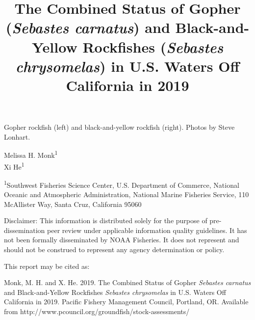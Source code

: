 \documentclass[12pt,]{article}
\title{The Combined Status of Gopher (\emph{Sebastes carnatus}) and
Black-and-Yellow Rockfishes (\emph{Sebastes chrysomelas}) in U.S. Waters
Off California in 2019}
\author{}
\date{}
\begin{document}
\maketitle


\begin{center}
\thispagestyle{empty}


\vspace{.5cm}

Gopher rockfish (left) and black-and-yellow rockfish (right).      
\small
Photos by Steve Lonhart.

\vspace{.3cm}


Melissa H. Monk\textsuperscript{1}\\
Xi He\textsuperscript{1}\\

\vspace{.5cm}

\small
\textsuperscript{1}Southwest Fisheries Science Center, U.S. Department of Commerce, National Oceanic and Atmospheric Administration, National Marine Fisheries Service, 110 McAllister Way, Santa Cruz, California 95060\\

\vspace{1.5cm}


Disclaimer: This information is distributed solely for the purpose of pre-dissemination
peer review under applicable information quality guidelines. It has not been formally
disseminated by NOAA Fisheries. It does not represent and should not be construed to
represent any agency determination or policy. 

\vspace{.1cm}


\newpage{\thispagestyle{empty}}


\begin{flushleft}
This report may be cited as:

Monk, M. H.  and X. He. 2019. The Combined Status of Gopher \emph{Sebastes carnatus} and Black-and-Yellow Rockfishes \emph{Sebastes chrysomelas} in U.S. Waters Off California in 2019. Pacific Fishery Management Council, Portland, OR. Available from http://www.pcouncil.org/groundfish/stock-assessments/
\end{flushleft}

\maketitle

\setcounter{page}{1}
\end{center}
\end{document}
